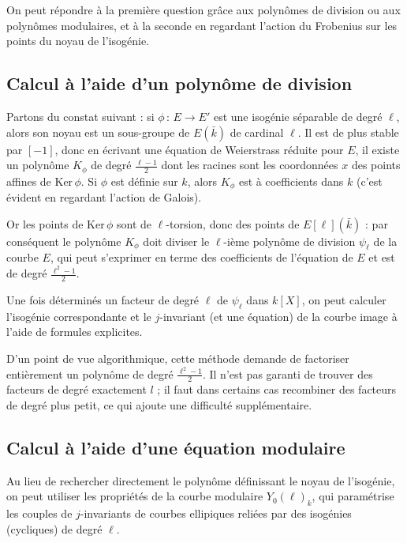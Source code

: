 \documentclass[11pt,a4paper]{article}
\newcommand{\vers}{\rightarrow}
\newcommand{\de}{\,:\,}
\theoremstyle{definition}
\begin{document}
On peut répondre à la première question grâce aux polynômes de division ou aux polynômes modulaires, et à la seconde en regardant l'action du Frobenius sur les points du noyau de l'isogénie.



\newpage

\subsection{Calcul à l'aide d'un polynôme de division}

Partons du constat suivant : si $\phi\de E\vers E'$ est une isogénie séparable de degré $\ell$, alors son noyau est un sous-groupe de $E(\bar{k})$ de cardinal $\ell$. Il est de plus stable par $[-1]$, donc en écrivant une équation de Weierstrass réduite pour $E$, il existe un polynôme $K_\phi$ de degré $\frac{\ell-1}{2}$ dont les racines sont les coordonnées $x$ des points affines de Ker\,$\phi$. Si $\phi$ est définie sur $k$, alors $K_\phi$ est à coefficients dans $k$ (c'est évident en regardant l'action de Galois).

Or les points de Ker\,$\phi$ sont de $\ell$-torsion, donc des points de $E[\ell](\bar{k})$ : par conséquent le polynôme $K_\phi$ doit diviser le $\ell$-ième polynôme de division $\psi_\ell$ de la courbe $E$, qui peut s'exprimer en terme des coefficients de l'équation de $E$ et est de degré $\frac{\ell^2-1}{2}$.

Une fois déterminés un facteur de degré $\ell$ de $\psi_\ell$ dans $k[X]$, on peut calculer l'isogénie correspondante et le $j$-invariant (et une équation) de la courbe image à l'aide de formules explicites.

D'un point de vue algorithmique, cette méthode demande de factoriser entièrement un polynôme de degré $\frac{\ell^2-1}{2}$. Il n'est pas garanti de trouver des facteurs de degré exactement $l$ ; il faut dans certains cas recombiner des facteurs de degré plus petit, ce qui ajoute une difficulté supplémentaire.


\newpage

\subsection{Calcul à l'aide d'une équation modulaire}

Au lieu de rechercher directement le polynôme définissant le noyau de l'isogénie, on peut utiliser les propriétés de la courbe modulaire $Y_0(\ell)_k$, qui paramétrise les couples de $j$-invariants de courbes ellipiques reliées par des isogénies (cycliques) de degré $\ell$. 
\end{document}
